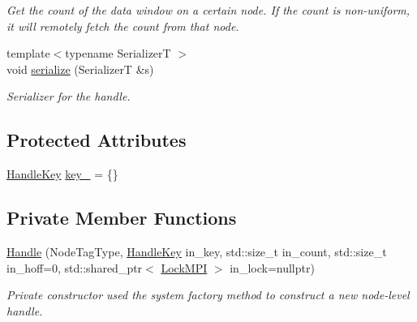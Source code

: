 \begin{DoxyCompactItemize}
\begin{DoxyCompactList}\small\item\em Get the count of the data window on a certain node. If the count is non-\/uniform, it will remotely fetch the count from that node. \end{DoxyCompactList}\item 
{\footnotesize template$<$typename SerializerT $>$ }\\void \hyperlink{structvt_1_1rdma_1_1_handle_3_01_t_00_01_e_00_01_index_t_00_01typename_01std_1_1enable__if__t_3_d15dac1b5db6e2bc0fb0b8aca42b1456_a861a97549fb4aaa9880401dbdf2e0a23}{serialize} (SerializerT \&s)
\begin{DoxyCompactList}\small\item\em Serializer for the handle. \end{DoxyCompactList}\end{DoxyCompactItemize}
\subsection*{Protected Attributes}
\begin{DoxyCompactItemize}
\item 
\hyperlink{structvt_1_1rdma_1_1_handle_key}{Handle\+Key} \hyperlink{structvt_1_1rdma_1_1_handle_3_01_t_00_01_e_00_01_index_t_00_01typename_01std_1_1enable__if__t_3_d15dac1b5db6e2bc0fb0b8aca42b1456_a1219d32435dff7029290180c23004b93}{key\+\_\+} = \{\}
\end{DoxyCompactItemize}
\subsection*{Private Member Functions}
\begin{DoxyCompactItemize}
\item 
\hyperlink{structvt_1_1rdma_1_1_handle_3_01_t_00_01_e_00_01_index_t_00_01typename_01std_1_1enable__if__t_3_d15dac1b5db6e2bc0fb0b8aca42b1456_a3d322fbc0fd7b9c8283b6fc5fed21a5d}{Handle} (Node\+Tag\+Type, \hyperlink{structvt_1_1rdma_1_1_handle_key}{Handle\+Key} in\+\_\+key, std\+::size\+\_\+t in\+\_\+count, std\+::size\+\_\+t in\+\_\+hoff=0, std\+::shared\+\_\+ptr$<$ \hyperlink{structvt_1_1rdma_1_1_lock_m_p_i}{Lock\+M\+PI} $>$ in\+\_\+lock=nullptr)
\begin{DoxyCompactList}\small\item\em Private constructor used the system factory method to construct a new node-\/level handle. \end{DoxyCompactList}\end{DoxyCompactItemize}
